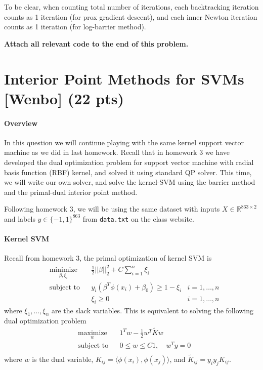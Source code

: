 \documentclass{article}
\theoremstyle{remark}
\theoremstyle{definition}
\begin{document}
\begin{enumerate}[(a)]
\begin{enumerate}
      To be clear, when counting total number of iterations, each backtracking iteration counts as 1 iteration (for prox gradient descent), and each inner Newton iteration counts as 1 iteration (for log-barrier method).
	    \end{enumerate}
\end{enumerate}

\textbf{Attach all relevant code to the end of this problem.}
\section{Interior Point Methods for SVMs [Wenbo] (22 pts)}

\paragraph{Overview} In this question we will continue playing with the same kernel support vector machine as we did in last homework. Recall that in homework 3 we have developed the dual optimization problem for support vector machine with radial basis function (RBF) kernel, and solved it using standard QP solver. This time, we will write our own solver, and solve the kernel-SVM using the
barrier method and the primal-dual interior point method.

Following homework 3, we will be using the same dataset with inputs $X \in \mathbb R^{863 \times 2}$ and labels $y \in \{-1, 1\}^{863}$ from \texttt{data.txt} on the class website.

\paragraph{Kernel SVM} Recall from homework 3, the primal optimization of
kernel SVM is
$$
\begin{aligned}
& \underset{\beta, \xi_i}{\text{minimize}} && \frac{1}{2}||\beta||_2^2 + C\sum_{i=1}^n\xi_i\\
& \text{subject to} && y_i(\beta^T\phi(x_i) + \beta_0) \geq 1-\xi_i & i = 1,\ldots, n\\
& && \xi_i \geq 0 & i = 1,\ldots, n
\end{aligned}
$$
where $\xi_1, \ldots, \xi_n$ are the slack variables. This is equivalent to solving the following dual optimization problem
\begin{equation}
\label{eq:dual}
\begin{aligned} 
  & \underset{w}{\text{maximize}} && 1^Tw - \frac{1}{2}w^T \tilde{K}w \\
  & \text{subject to} && 0\leq w\leq C1, \quad w^Ty = 0\\
\end{aligned}
\end{equation}
where $w$ is the dual variable, $K_{ij} = \langle\phi(x_i), \phi(x_j)\rangle$, and $\tilde{K}_{ij} = y_iy_jK_{ij}$.
\end{document}
